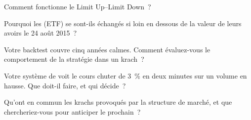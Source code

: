 \begin{interviewq}\label{iq:m1:stress-case-studies:2}
Comment fonctionne le Limit Up--Limit Down~?
\end{interviewq}

\begin{interviewq}\label{iq:m1:stress-case-studies:3}
Pourquoi les  (ETF) se sont-ils échangés si loin en dessous de la valeur de leurs
avoirs le 24 août 2015~?
\end{interviewq}

\begin{interviewq}\label{iq:m1:stress-case-studies:4}
Votre backtest couvre cinq années calmes. Comment évaluez-vous le
comportement de la stratégie dans un krach~?
\end{interviewq}

\begin{interviewq}\label{iq:m1:stress-case-studies:5}
Votre système de  voit le cours chuter de 3~\% en deux minutes sur un volume en hausse.
Que doit-il faire, et qui décide~?
\end{interviewq}

\begin{interviewq}\label{iq:m1:stress-case-studies:6}
Qu'ont en commun les krachs provoqués par la structure de marché, et que
chercheriez-vous pour anticiper le prochain~?
\end{interviewq}
